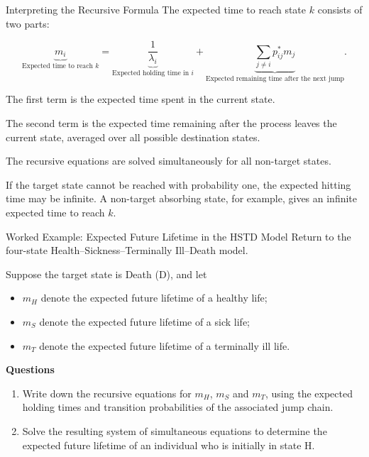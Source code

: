 \documentclass[
  ignorenonframetext,
  aspectratio=169,
]{beamer}
\providecommand{\tightlist}{%
  \setlength{\itemsep}{0pt}\setlength{\parskip}{0pt}}
\begin{document}
\begin{frame}{Interpreting the Recursive Formula}
\protect{}\label{interpreting-the-recursive-formula}
The expected time to reach state \(k\) consists of two parts:

\[
\underbrace{m_i}_{\text{Expected time to reach }k}
=
\underbrace{\frac{1}{\lambda_i}}_{\text{Expected holding time in }i}
+
\underbrace{\sum_{j\neq i}p_{ij}^*m_j}_{\text{Expected remaining time after the next jump}}.
\]

The first term is the expected time spent in the current state.

The second term is the expected time remaining after the process leaves
the current state, averaged over all possible destination states.

The recursive equations are solved simultaneously for all non-target
states.

If the target state cannot be reached with probability one, the expected
hitting time may be infinite. A non-target absorbing state, for example,
gives an infinite expected time to reach \(k\).
\end{frame}

\begin{frame}{Worked Example: Expected Future Lifetime in the HSTD
Model}
\protect{}\label{worked-example-expected-future-lifetime-in-the-hstd-model}
Return to the four-state Health--Sickness--Terminally Ill--Death model.

Suppose the target state is Death (D), and let

\begin{itemize}
\tightlist
\item
  \(m_H\) denote the expected future lifetime of a healthy life;
\item
  \(m_S\) denote the expected future lifetime of a sick life;
\item
  \(m_T\) denote the expected future lifetime of a terminally ill life.
\end{itemize}

\textbf{Questions}

\begin{enumerate}
\item
  Write down the recursive equations for \(m_H\), \(m_S\) and \(m_T\),
  using the expected holding times and transition probabilities of the
  associated jump chain.
\item
  Solve the resulting system of simultaneous equations to determine the
  expected future lifetime of an individual who is initially in state H.
\end{enumerate}
\end{frame}
\end{document}

